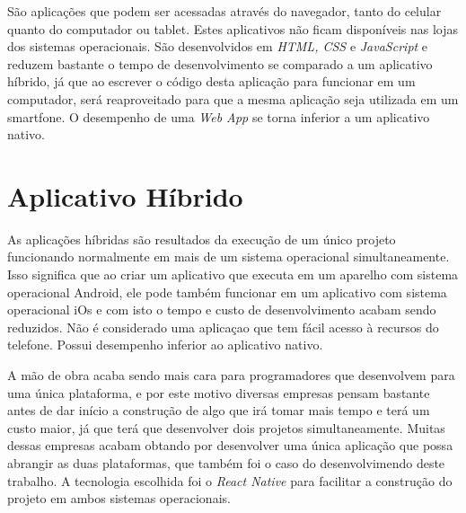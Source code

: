 São aplicações que podem ser acessadas através do navegador, tanto do celular quanto do computador ou tablet. Estes aplicativos não ficam disponíveis nas lojas dos sistemas operacionais. São desenvolvidos em \textit{HTML, CSS} e \textit{JavaScript} e reduzem bastante o tempo de desenvolvimento se comparado a um aplicativo híbrido, já que ao escrever o código desta aplicação para funcionar em um computador, será reaproveitado para que a mesma aplicação seja utilizada em um smartfone. O desempenho de uma \textit{Web App} se torna inferior a um aplicativo nativo.


\section{Aplicativo Híbrido}
As aplicações híbridas são resultados da execução de um único projeto funcionando normalmente em mais de um sistema operacional simultaneamente. Isso significa que ao criar um aplicativo que executa em um aparelho com sistema operacional Android, ele pode também funcionar em um aplicativo com sistema operacional iOs e com isto o tempo e custo de desenvolvimento acabam sendo reduzidos. Não é considerado uma aplicaçao que tem fácil acesso à recursos do telefone. Possui desempenho inferior ao aplicativo nativo.

A mão de obra acaba sendo mais cara para programadores que desenvolvem para uma única plataforma, e por este motivo diversas empresas pensam bastante antes de dar início a construção de algo que irá tomar mais tempo e terá um custo maior, já que terá que desenvolver dois projetos simultaneamente. Muitas dessas empresas acabam obtando por desenvolver uma única aplicação que possa abrangir as duas plataformas, que também foi o caso do desenvolvimendo deste trabalho. A tecnologia escolhida foi o \textit{React Native} para facilitar a construção do projeto em ambos sistemas operacionais. 






